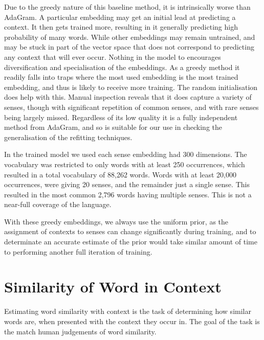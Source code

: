 \documentclass{sig-alternate}
\begin{document}
Due to the greedy nature of this baseline method, it is intrinsically worse than AdaGram. A particular embedding may get an initial lead at predicting a context. It then gets trained more, resulting in it generally predicting high probability of many words. While other embeddings may remain untrained, and may be stuck in part of the vector space that does not correspond to predicting any context that will ever occur. Nothing in the model to encourages diversification and specialisation of the embeddings. As a greedy method it readily falls into traps
 where the most used embedding is the most trained embedding, and thus is likely to receive more training. The random initialisation does help with this. Manual inspection reveals that it does capture a variety of senses, though with significant repetition of common senses, and with rare senses being largely missed. Regardless of its low quality it is a fully independent method from AdaGram, and so is suitable for our use in checking the generalisation of the refitting techniques.

In the trained model we used each sense embedding had 300 dimensions.
The vocabulary was restricted to only words with at least 250 occurrences, which resulted in a total vocabulary of 88,262 words. Words with at least 20,000 occurrences, were giving 20 senses, and the remainder just a single sense. This resulted in the most common 2,796 words having multiple senses. This is not a near-full coverage of the language. 

With these greedy embeddings, we always use the uniform prior, as the assignment of contexts  to senses can change significantly during training, and to determinate an accurate estimate of the prior would take similar amount of time to performing another full iteration of training.



\section{Similarity of Word in Context} \label{SimilarityInContext}
Estimating word similarity with context is the task of determining how similar words are, when presented with the context they occur in. The goal of the task is the match human judgements of word similarity.
\end{document}
